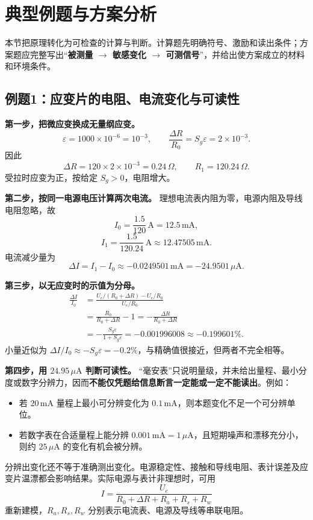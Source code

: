 \clearpage
\section{典型例题与方案分析}
\label{sec:ch4-worked-examples}

\noindent 本节把原理转化为可检查的计算与判断。计算题先明确符号、激励和读出条件；方案题应完整写出“\textbf{被测量 $\to$ 敏感变化 $\to$ 可测信号}”，并给出使方案成立的材料和环境条件。

\subsection{例题1：应变片的电阻、电流变化与可读性}


\sol
\textbf{第一步，把微应变换成无量纲应变。}
\[
\varepsilon=1000\times10^{-6}=10^{-3},\qquad
\frac{\Delta R}{R_0}=S_g\varepsilon=2\times10^{-3}.
\]
因此
\[
\boxed{\Delta R=120\times2\times10^{-3}=0.24\,\Omega},\qquad
R_1=120.24\,\Omega.
\]
受拉时应变为正，按给定 $S_g>0$，电阻增大。

\textbf{第二步，按同一电源电压计算两次电流。}
理想电流表内阻为零，电源内阻及导线电阻忽略，故
\[
\boxed{I_0=\frac{1.5}{120}\,\mathrm A=12.5\,\mathrm{mA}},
\]
\[
\boxed{I_1=\frac{1.5}{120.24}\,\mathrm A
\approx12.47505\,\mathrm{mA}}.
\]
电流减少量为
\[
\Delta I=I_1-I_0\approx-0.0249501\,\mathrm{mA}
=\boxed{-24.9501\,\mu\mathrm A}.
\]

\textbf{第三步，以无应变时的示值为分母。}
\begin{align*}
\frac{\Delta I}{I_0}
&=\frac{U_e/(R_0+\Delta R)-U_e/R_0}{U_e/R_0}\\
&=\frac{R_0}{R_0+\Delta R}-1
=-\frac{\Delta R}{R_0+\Delta R}\\
&=-\frac{S_g\varepsilon}{1+S_g\varepsilon}
=\boxed{-0.001996008\approx-0.199601\%}.
\end{align*}
小量近似为 $\Delta I/I_0\approx-S_g\varepsilon=-0.2\%$，与精确值很接近，但两者不完全相等。

\textbf{第四步，用 $24.95\,\mu\mathrm A$ 判断可读性。}
“毫安表”只说明量级，并未给出量程、最小分度或数字分辨力，因而\textbf{不能仅凭题给信息断言一定能或一定不能读出}。例如：
\begin{itemize}
\item 若 $20\,\mathrm{mA}$ 量程上最小可分辨变化为 $0.1\,\mathrm{mA}$，则本题变化不足一个可分辨单位。
\item 若数字表在合适量程上能分辨 $0.001\,\mathrm{mA}=1\,\mu\mathrm A$，且短期噪声和漂移充分小，则约 $25\,\mu\mathrm A$ 的变化有机会被分辨。
\end{itemize}
分辨出变化还不等于准确测出变化。电源稳定性、接触和导线电阻、表计误差及应变片温漂都会影响结果。实际电源与表计非理想时，可用
\[
I=\frac{U_e}{R_0+\Delta R+R_a+R_s+R_w}
\]
重新建模，$R_a,R_s,R_w$ 分别表示电流表、电源及导线等串联电阻。

